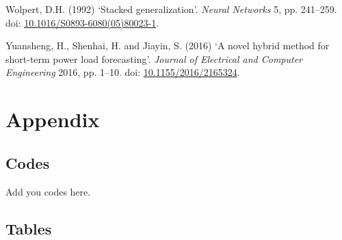 \documentclass[mstat,12pt]{unswthesis}
\begin{document}
\begin{CSLReferences}{0}{1}
Wolpert, D.H. (1992) {`Stacked generalization'}. \emph{Neural Networks}
5, pp. 241--259. doi:
\href{https://doi.org/10.1016/S0893-6080(05)80023-1}{10.1016/S0893-6080(05)80023-1}.

Yuansheng, H., Shenhai, H. and Jiayin, S. (2016) {`A novel hybrid method
for short-term power load forecasting'}. \emph{Journal of Electrical and
Computer Engineering} 2016, pp. 1--10. doi:
\href{https://doi.org/10.1155/2016/2165324}{10.1155/2016/2165324}.

\end{CSLReferences}




\section*{Appendix}\label{appendix}

\subsection*{\texorpdfstring{\textbf{Codes}}{Codes}}\label{codes}

Add you codes here.

\subsection*{\texorpdfstring{\textbf{Tables}}{Tables}}\label{tables}
\end{document}
